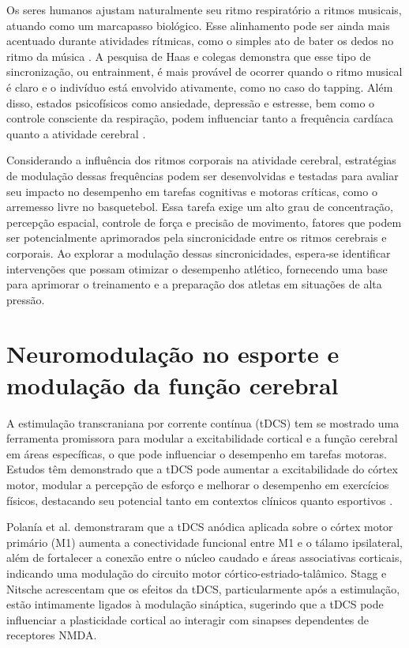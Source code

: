 Os seres humanos ajustam naturalmente seu ritmo respiratório a ritmos musicais, atuando como um marcapasso biológico. Esse alinhamento pode ser ainda mais acentuado durante atividades rítmicas, como o simples ato de bater os dedos no ritmo da música \cite{haas1985}. A pesquisa de Haas e colegas demonstra que esse tipo de sincronização, ou entrainment, é mais provável de ocorrer quando o ritmo musical é claro e o indivíduo está envolvido ativamente, como no caso do tapping. Além disso, estados psicofísicos como ansiedade, depressão e estresse, bem como o controle consciente da respiração, podem influenciar tanto a frequência cardíaca quanto a atividade cerebral \cite{criscuolo2022}.

Considerando a influência dos ritmos corporais na atividade cerebral, estratégias de modulação dessas frequências podem ser desenvolvidas e testadas para avaliar seu impacto no desempenho em tarefas cognitivas e motoras críticas, como o arremesso livre no basquetebol. Essa tarefa exige um alto grau de concentração, percepção espacial, controle de força e precisão de movimento, fatores que podem ser potencialmente aprimorados pela sincronicidade entre os ritmos cerebrais e corporais. Ao explorar a modulação dessas sincronicidades, espera-se identificar intervenções que possam otimizar o desempenho atlético, fornecendo uma base para aprimorar o treinamento e a preparação dos atletas em situações de alta pressão.

\section{Neuromodulação no esporte e modulação da função cerebral}
A estimulação transcraniana por corrente contínua (tDCS) tem se mostrado uma ferramenta promissora para modular a excitabilidade cortical e a função cerebral em áreas específicas, o que pode influenciar o desempenho em tarefas motoras. Estudos têm demonstrado que a tDCS pode aumentar a excitabilidade do córtex motor, modular a percepção de esforço e melhorar o desempenho em exercícios físicos, destacando seu potencial tanto em contextos clínicos quanto esportivos \cite{nitsche2000, okano2013}.

Polanía et al. \cite{polania2012} demonstraram que a tDCS anódica aplicada sobre o córtex motor primário (M1) aumenta a conectividade funcional entre M1 e o tálamo ipsilateral, além de fortalecer a conexão entre o núcleo caudado e áreas associativas corticais, indicando uma modulação do circuito motor córtico-estriado-talâmico. Stagg e Nitsche \cite{stagg2011} acrescentam que os efeitos da tDCS, particularmente após a estimulação, estão intimamente ligados à modulação sináptica, sugerindo que a tDCS pode influenciar a plasticidade cortical ao interagir com sinapses dependentes de receptores NMDA.

